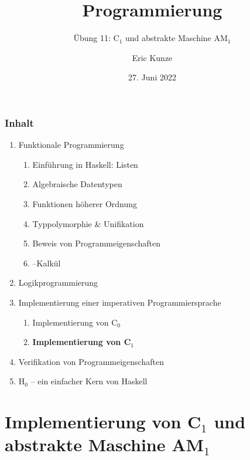 \documentclass{beamer}
\begin{document}
	
	\title{Programmierung}
	\subtitle{Übung 11: C${}_\text{1}$ und abstrakte Maschine AM${}_\text{1}$}
	\author{Eric Kunze}
	\date{27. Juni 2022}
	
	\maketitle
	


\begin{frame}[fragile] \frametitle{Inhalt}
	\begin{enumerate}
		\item Funktionale Programmierung
		\begin{enumerate}
			\item Einführung in Haskell: Listen
			\item Algebraische Datentypen
			\item Funktionen höherer Ordnung
			\item Typpolymorphie \& Unifikation
			\item Beweis von Programmeigenschaften
			\item \textlambda--Kalkül
		\end{enumerate}
		\item Logikprogrammierung
		\item Implementierung einer imperativen Programmiersprache
		\begin{enumerate}
			\item Implementierung von C${}_\text{0}$
			\item \textbf{Implementierung von C${}_\text{1}$}
		\end{enumerate}
		\item Verifikation von Programmeigenschaften
		\item H${}_\text{0}$ -- ein einfacher Kern von Haskell
	\end{enumerate}
\end{frame}



\section{Implementierung von C${}_\text{1}$ und abstrakte Maschine AM${}_\text{1}$}
\end{document}
